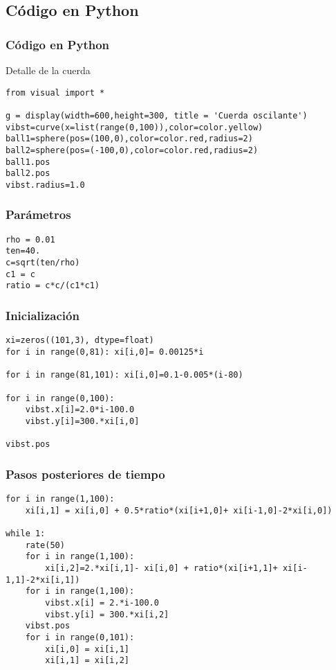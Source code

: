 \subsection{Código en Python}
\begin{frame}[fragile]
\frametitle{Código en Python}
Detalle de la cuerda
\begin{lstlisting}
from visual import *

g = display(width=600,height=300, title = 'Cuerda oscilante')
vibst=curve(x=list(range(0,100)),color=color.yellow)
ball1=sphere(pos=(100,0),color=color.red,radius=2)
ball2=sphere(pos=(-100,0),color=color.red,radius=2)
ball1.pos
ball2.pos
vibst.radius=1.0
\end{lstlisting}
\end{frame}
\begin{frame}[fragile]
\frametitle{Parámetros}
\begin{lstlisting}
rho = 0.01
ten=40.         
c=sqrt(ten/rho)
c1 = c
ratio = c*c/(c1*c1)
\end{lstlisting}
\end{frame}
\begin{frame}[fragile]
\frametitle{Inicialización}
\begin{lstlisting}
xi=zeros((101,3), dtype=float)
for i in range(0,81): xi[i,0]= 0.00125*i

for i in range(81,101): xi[i,0]=0.1-0.005*(i-80)

for i in range(0,100):
    vibst.x[i]=2.0*i-100.0
    vibst.y[i]=300.*xi[i,0]
    
vibst.pos     
\end{lstlisting}
\end{frame}
\begin{frame}[fragile]
\frametitle{Pasos posteriores de tiempo}
\begin{lstlisting}
for i in range(1,100):
    xi[i,1] = xi[i,0] + 0.5*ratio*(xi[i+1,0]+ xi[i-1,0]-2*xi[i,0])

while 1:
    rate(50)
    for i in range(1,100):
        xi[i,2]=2.*xi[i,1]- xi[i,0] + ratio*(xi[i+1,1]+ xi[i-1,1]-2*xi[i,1])
    for i in range(1,100):
        vibst.x[i] = 2.*i-100.0
        vibst.y[i] = 300.*xi[i,2]
    vibst.pos
    for i in range(0,101):
        xi[i,0] = xi[i,1]
        xi[i,1] = xi[i,2]    
\end{lstlisting}
\end{frame}
